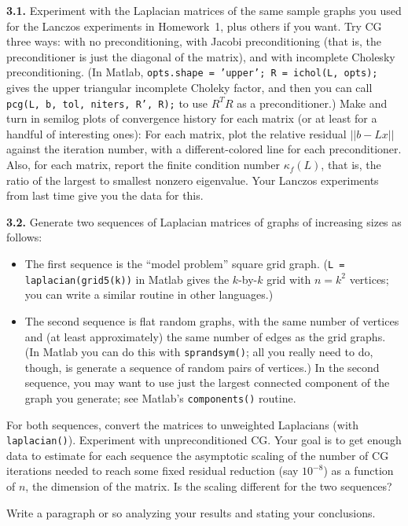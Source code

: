 \documentclass[11pt]{article}
\begin{document}
\par\medskip
{\bf 3.1.}
Experiment with the Laplacian matrices of the same sample graphs you
used for the Lanczos experiments in Homework~1, plus others if you want.
Try CG three ways:  with no preconditioning, with Jacobi preconditioning
(that is, the preconditioner is just the diagonal of the matrix), and
with incomplete Cholesky preconditioning.
(In Matlab, {\tt opts.shape = 'upper'; R = ichol(L, opts);} 
gives the upper triangular incomplete Choleky factor, and then
you can call {\tt pcg(L, b, tol, niters, R', R);} 
to use $R^TR$ as a preconditioner.)
Make and turn in semilog plots of convergence history for each matrix
(or at least for a handful of interesting ones):
For each matrix, plot the relative residual $||b-Lx||$ against the 
iteration number, with a different-colored line for each preconditioner.
Also, for each matrix, report the finite condition number $\kappa_f(L)$, 
that is, the ratio of the largest to smallest nonzero eigenvalue.  
Your Lanczos experiments from last time give you the data for this.

\par\medskip
{\bf 3.2.}
Generate two sequences of Laplacian matrices of graphs of increasing sizes as
follows:  
\begin{itemize}
\item
The first sequence is the ``model problem'' square grid graph.
({\tt L = laplacian(grid5(k))} in Matlab
gives the $k$-by-$k$ grid with $n=k^2$ vertices;
you can write a similar routine in other languages.)
\item
The second sequence is flat random graphs, with the same number of vertices
and (at least approximately) the same number of edges as the grid graphs.
(In Matlab you can do this with {\tt sprandsym()};
all you really need to do, though, is generate a sequence of random
pairs of vertices.)
In the second sequence, you may want to use just the largest connected 
component of the graph you generate; see Matlab's {\tt components()} routine.
\end{itemize}
For both sequences, convert the matrices to unweighted Laplacians 
(with {\tt laplacian()}).
Experiment with unpreconditioned CG.
Your goal is to get enough data to estimate for each sequence the 
asymptotic scaling of the number of CG iterations needed to reach 
some fixed residual reduction (say $10^{-8}$) as a function of $n$, 
the dimension of the matrix.  
Is the scaling different for the two sequences?
\par
Write a paragraph or so analyzing your results and stating your conclusions.
\end{document}
